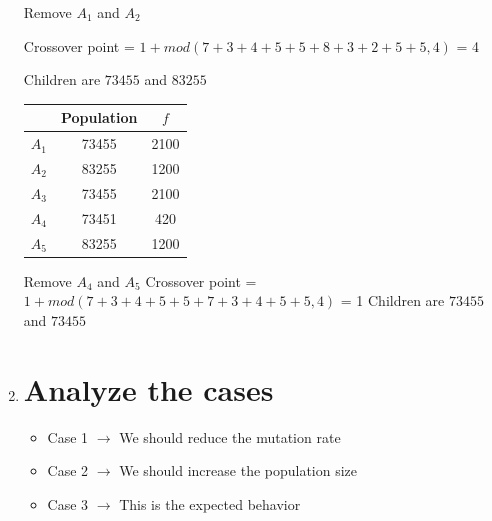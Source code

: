 \documentclass{article}
\begin{document}
\begin{enumerate}
    Remove $A_1$ and $A_2$

    Crossover point = $1 + mod(7+3+4+5+5+8+3+2+5+5, 4)$ = 4

    Children are $73455$ and $83255$


    \begin{table}[h]
        \centering
        \begin{tabular}{c|c|c}
            & Population & $f$ \\
            \hline
            $A_1$ & 73455 & 2100 \\
            $A_2$ & 83255 & 1200 \\
            $A_3$ & 73455 & 2100 \\
            $A_4$ & 73451 & 420 \\
            $A_5$ & 83255 & 1200 \\
        \end{tabular}
    \end{table}
    Remove $A_4$ and $A_5$
    Crossover point = $1 + mod(7+3+4+5+5+7+3+4+5+5, 4)$ = 1
    Children are $73455$ and $73455$


    \item \section*{Analyze the cases}
    \begin{itemize}
        \item Case 1 $\rightarrow$ We should reduce the mutation rate
        \item Case 2 $\rightarrow$ We should increase the population size
        \item Case 3 $\rightarrow$ This is the expected behavior
    \end{itemize}

\end{enumerate}
\end{document}

